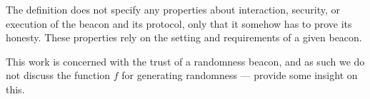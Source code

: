 
The definition does not specify any properties about interaction, security, or execution of the beacon and its protocol, only that it somehow has to prove its honesty.
These properties rely on the setting and requirements of a given beacon.

This work is concerned with the trust of a randomness beacon, and as such we do not discuss the function $f$ for generating  randomness --- \citet{bonneau2015bitcoin} provide some insight on this.

